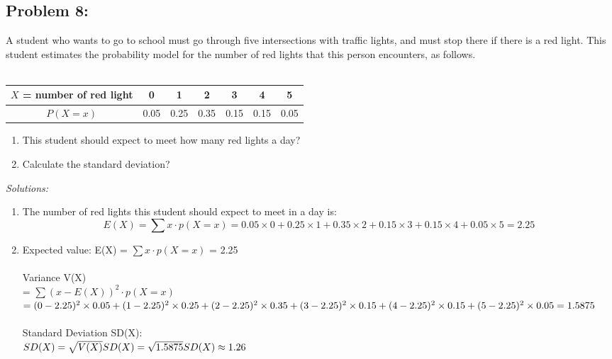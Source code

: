 \documentclass[a4paper]{article}
\begin{document}
	\subsection*{Problem 8:}
	A student who wants to go to school must go through five intersections with traffic lights, and must stop there if there is a red light. This student estimates the probability model for the number of red lights that this person encounters, as follows. \\ \\
	\begin{tabular}{|c|c|c|c|c|c|c|}
		\hline
		$X$ = number of red light & 0 & 1 & 2 & 3 & 4 & 5 \\
		\hline
		$P(X = x)$ & 0.05 & 0.25 & 0.35 & 0.15 & 0.15 & 0.05 \\
		\hline
	\end{tabular}
	\begin{enumerate}
		\item This student should expect to meet how many red lights a day?
		\item Calculate the standard deviation?
	\end{enumerate}
	\textit{Solutions:}
	\begin{enumerate}
	    \item The number of red lights this student should expect to meet in a day is:
	    \begin{equation*}
	        E(X) = \sum x \cdot p(X = x) =  0.05\times 0+0.25\times 1+0.35\times 2+0.15\times 3+0.15\times4+0.05\times 5 = 2.25
	    \end{equation*}
	    \item 
    	Expected value: E(X) = $\sum x \cdot p(X = x)$ =  2.25\\\\
	    Variance V(X)\\ 
	    = $\sum (x - E(X))^2\cdot p(X = x)$\\
	    \begin{math}
	        =(0 - 2.25)^2\times0.05 + (1 - 2.25)^2\times0.25+(2-2.25)^2\times 0.35+(3-2.25)^2\times 0.15+(4-2.25)^2\times 0.15+(5-2.25)^2\times 0.05
	        \newline
	        = 1.5875
	    \end{math}\\\\
	    Standard Deviation SD(X):\\
	    \begin{math}
	    SD(X) = \sqrt{V(X)}
	    \newline
	    SD(X) = \sqrt{1.5875}
	    \newline
	    SD(X) \approx 1.26
	    \end{math}
	    \end{enumerate}
\end{document}
